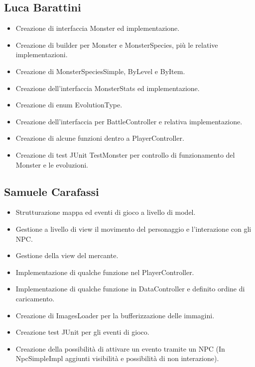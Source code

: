 \subsection*{Luca Barattini}
\begin{itemize}
    \item Creazione di interfaccia Monster ed implementazione.
    \item Creazione di builder per Monster e MonsterSpecies, più le relative implementazioni.
    \item Creazione di MonsterSpeciesSimple, ByLevel e ByItem.
    \item Creazione dell'interfaccia MonsterStats ed implementazione.
    \item Creazione di enum EvolutionType.
    \item Creazione dell'interfaccia per BattleController e relativa implementazione.
    \item Creazione di alcune funzioni dentro a PlayerController.
    \item Creazione di test JUnit TestMonster per controllo di funzionamento del Monster e le evoluzioni.
\end{itemize}


\subsection*{Samuele Carafassi}
\begin{itemize}
    \item Strutturazione mappa ed eventi di gioco a livello di model.
    \item Gestione a livello di view il movimento del personaggio e l'interazione con gli NPC.
    \item Gestione della view del mercante.
    \item Implementazione di qualche funzione nel PlayerController.
    \item Implementazione di qualche funzione in DataController e definito ordine di caricamento.
    \item Creazione di ImagesLoader per la bufferizzazione delle immagini.
    \item Creazione test JUnit per gli eventi di gioco.
    \item Creazione della possibilità di attivare un evento tramite un NPC (In NpcSimpleImpl aggiunti visibilità e possibilità di non interazione).
\end{itemize}


